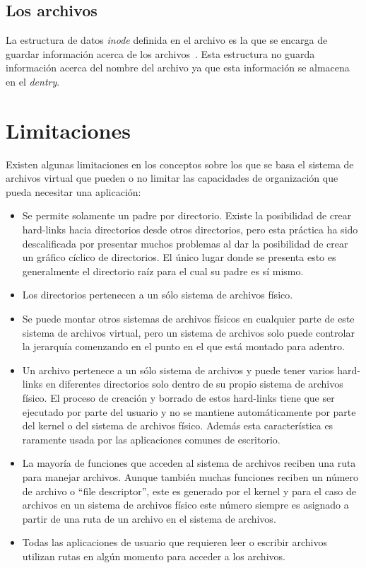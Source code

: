 \subsection{Los archivos}

La estructura de datos \textit{inode} definida en el archivo  es la que se encarga de guardar información acerca de los archivos~\cite{inode:wikipedia}. Esta estructura no guarda información acerca del nombre del archivo ya que esta información se almacena en el \textit{dentry}.


\section{Limitaciones}

Existen algunas limitaciones en los conceptos sobre los que se basa el sistema de archivos virtual que pueden o no limitar las capacidades de organización que pueda necesitar una aplicación:

\begin{itemize}
\item Se permite solamente un padre por directorio. Existe la posibilidad de crear hard-links hacia directorios desde otros directorios, pero esta práctica ha sido descalificada por presentar muchos problemas al dar la posibilidad de crear un gráfico cíclico de directorios. El único lugar donde se presenta esto es generalmente el directorio raíz para el cual su padre es sí mismo.
\item Los directorios pertenecen a un sólo sistema de archivos físico.
\item Se puede montar otros sistemas de archivos físicos en cualquier parte de este sistema de archivos virtual, pero un sistema de archivos solo puede controlar la jerarquía comenzando en el punto en el que está montado para adentro.
\item Un archivo pertenece a un sólo sistema de archivos y puede tener varios hard-links en diferentes directorios solo dentro de su propio sistema de archivos físico. El proceso de creación y borrado de estos hard-links tiene que ser ejecutado por parte del usuario y no se mantiene automáticamente por parte del kernel o del sistema de archivos físico. Además esta característica es raramente usada por las aplicaciones comunes de escritorio.
\item La mayoría de funciones que acceden al sistema de archivos reciben una ruta para manejar archivos. Aunque también muchas funciones reciben un número de archivo o ``file descriptor'', este es generado por el kernel y para el caso de archivos en un sistema de archivos físico este número siempre es asignado a partir de una ruta de un archivo en el sistema de archivos.
\item Todas las aplicaciones de usuario que requieren leer o escribir archivos utilizan rutas en algún momento para acceder a los archivos.
\end{itemize}

